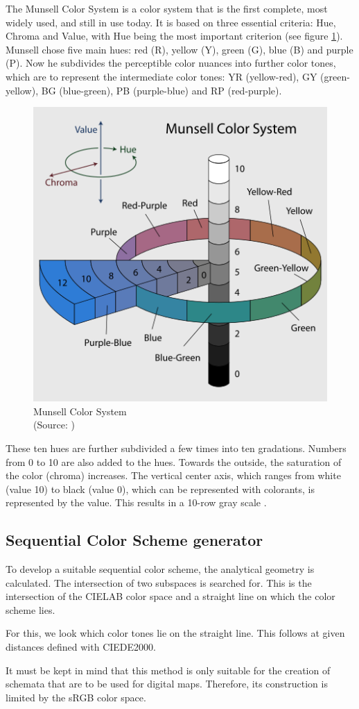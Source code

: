 The Munsell Color System is a color system that is the first complete, most widely used, and still in use today. It is based on three essential criteria: Hue, Chroma and Value, with Hue being the most important criterion (see figure \ref{fig:munsell}). Munsell chose five main hues: red (R), yellow (Y), green (G), blue (B) and purple (P). Now he subdivides the perceptible color nuances into further color tones, which are to represent the intermediate color tones: YR (yellow-red), GY (green-yellow), BG (blue-green), PB (purple-blue) and RP (red-purple).
\begin{figure}
	\centering
	\includegraphics[width=0.4\linewidth]{source/images/munsell}
	\caption{Munsell Color System \\
		(Source: \textcite{munsell2007})}
	\label{fig:munsell}
\end{figure}
These ten hues are further subdivided a few times into ten gradations. Numbers from 0 to 10 are also added to the hues. Towards the outside, the saturation of the color (chroma) increases. The vertical center axis, which ranges from white (value 10) to black (value 0), which can be represented with colorants, is represented by the value. This results in a 10-row gray scale \parencite{munsell1915}.

\subsection{Sequential Color Scheme generator}
To develop a suitable sequential color scheme, the analytical geometry is calculated. The intersection of two subspaces is searched for. This is the intersection of the CIELAB color space and a straight line on which the color scheme lies.

For this, we look which color tones lie on the straight line. This follows at given distances defined with CIEDE2000. 

It must be kept in mind that this method is only suitable for the creation of schemata that are to be used for digital maps. Therefore, its construction is limited by the sRGB color space. 

